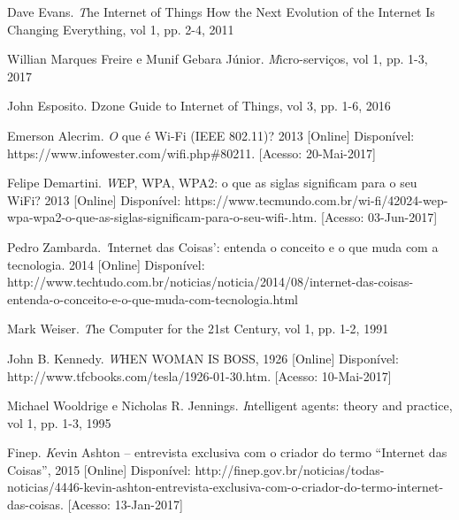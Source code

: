 \documentclass[journal]{IEEEtran}
\begin{document}
%
%
%
\begin{thebibliography}{1}

Dave Evans. \emph The Internet of Things How the Next Evolution of the Internet Is Changing Everything, vol 1, pp. 2-4, 2011

Willian Marques Freire e Munif Gebara Júnior. \emph Micro-serviços, vol 1, pp. 1-3, 2017

John Esposito. \emphThe Dzone Guide to Internet of Things, vol 3, pp. 1-6, 2016

Emerson Alecrim. \emph O que é Wi-Fi (IEEE 802.11)? 2013 [Online] Disponível: https://www.infowester.com/wifi.php\#80211. [Acesso: 20-Mai-2017]

Felipe Demartini. \emph WEP, WPA, WPA2: o que as siglas significam para o seu WiFi? 2013 [Online] Disponível: https://www.tecmundo.com.br/wi-fi/42024-wep-wpa-wpa2-o-que-as-siglas-significam-para-o-seu-wifi-.htm. [Acesso: 03-Jun-2017]

Pedro Zambarda. \emph 'Internet das Coisas': entenda o conceito e o que muda com a tecnologia. 2014 [Online] Disponível: http://www.techtudo.com.br/noticias/noticia/2014/08/internet-das-coisas-entenda-o-conceito-e-o-que-muda-com-tecnologia.html 

Mark Weiser. \emph The Computer for the 21st Century, vol 1, pp. 1-2, 1991

John B. Kennedy. \emph WHEN WOMAN IS BOSS, 1926 [Online] Disponível: http://www.tfcbooks.com/tesla/1926-01-30.htm. [Acesso: 10-Mai-2017]

Michael Wooldrige e Nicholas R. Jennings. \emph Intelligent agents: theory and practice, vol 1, pp. 1-3, 1995

Finep. \emph Kevin Ashton – entrevista exclusiva com o criador do termo “Internet das Coisas”, 2015 [Online] Disponível: http://finep.gov.br/noticias/todas-noticias/4446-kevin-ashton-entrevista-exclusiva-com-o-criador-do-termo-internet-das-coisas. [Acesso: 13-Jan-2017]


\end{thebibliography}
\end{document}
